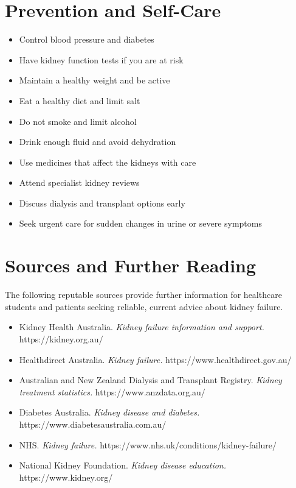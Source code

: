 \section*{Prevention and Self-Care}
\begin{itemize}
    \item Control blood pressure and diabetes
    \item Have kidney function tests if you are at risk
    \item Maintain a healthy weight and be active
    \item Eat a healthy diet and limit salt
    \item Do not smoke and limit alcohol
    \item Drink enough fluid and avoid dehydration
    \item Use medicines that affect the kidneys with care
    \item Attend specialist kidney reviews
    \item Discuss dialysis and transplant options early
    \item Seek urgent care for sudden changes in urine or severe symptoms
\end{itemize}

\section*{Sources and Further Reading}
The following reputable sources provide further information for healthcare students and patients seeking reliable, current advice about kidney failure.
\begin{itemize}
    \item Kidney Health Australia. \textit{Kidney failure information and support.} https://kidney.org.au/
    \item Healthdirect Australia. \textit{Kidney failure.} https://www.healthdirect.gov.au/
    \item Australian and New Zealand Dialysis and Transplant Registry. \textit{Kidney treatment statistics.} https://www.anzdata.org.au/
    \item Diabetes Australia. \textit{Kidney disease and diabetes.} https://www.diabetesaustralia.com.au/
    \item NHS. \textit{Kidney failure.} https://www.nhs.uk/conditions/kidney-failure/
    \item National Kidney Foundation. \textit{Kidney disease education.} https://www.kidney.org/
\end{itemize}
